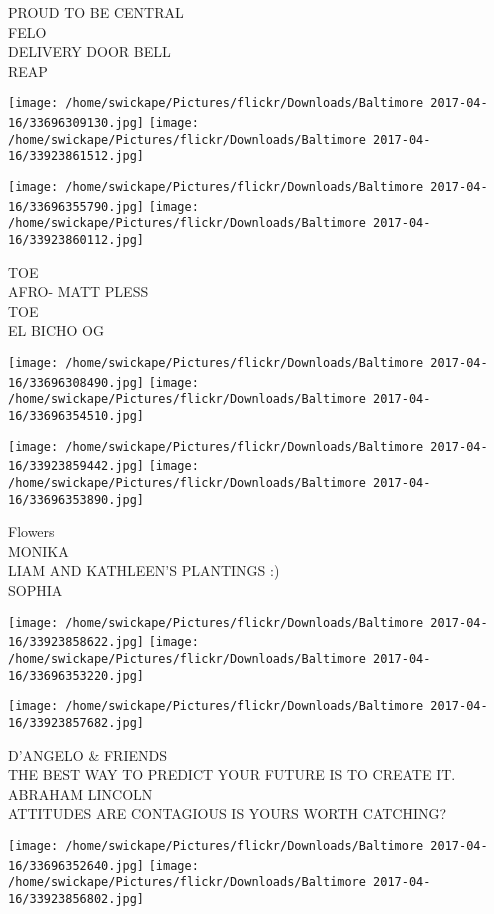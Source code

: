 \documentclass[10pt,letterpaper]{article}
\begin{document}
PROUD TO BE CENTRAL\\
FELO\\
DELIVERY DOOR BELL\\
REAP
\pagebreak

\texttt{[image: /home/swickape/Pictures/flickr/Downloads/Baltimore 2017-04-16/33696309130.jpg]}
\texttt{[image: /home/swickape/Pictures/flickr/Downloads/Baltimore 2017-04-16/33923861512.jpg]}

\texttt{[image: /home/swickape/Pictures/flickr/Downloads/Baltimore 2017-04-16/33696355790.jpg]}
\texttt{[image: /home/swickape/Pictures/flickr/Downloads/Baltimore 2017-04-16/33923860112.jpg]}

TOE\\
AFRO{-} MATT PLESS\\
TOE\\
EL BICHO OG
\pagebreak

\texttt{[image: /home/swickape/Pictures/flickr/Downloads/Baltimore 2017-04-16/33696308490.jpg]}
\texttt{[image: /home/swickape/Pictures/flickr/Downloads/Baltimore 2017-04-16/33696354510.jpg]}

\texttt{[image: /home/swickape/Pictures/flickr/Downloads/Baltimore 2017-04-16/33923859442.jpg]}
\texttt{[image: /home/swickape/Pictures/flickr/Downloads/Baltimore 2017-04-16/33696353890.jpg]}

Flowers\\
MONIKA\\
LIAM AND KATHLEEN'S PLANTINGS :)\\
SOPHIA
\pagebreak

\texttt{[image: /home/swickape/Pictures/flickr/Downloads/Baltimore 2017-04-16/33923858622.jpg]}
\texttt{[image: /home/swickape/Pictures/flickr/Downloads/Baltimore 2017-04-16/33696353220.jpg]}

\vspace{0.25in}
\texttt{[image: /home/swickape/Pictures/flickr/Downloads/Baltimore 2017-04-16/33923857682.jpg]}

D'ANGELO \& FRIENDS\\
THE BEST WAY TO PREDICT YOUR FUTURE IS TO CREATE IT. ABRAHAM LINCOLN\\
ATTITUDES ARE CONTAGIOUS IS YOURS WORTH CATCHING?
\pagebreak

\texttt{[image: /home/swickape/Pictures/flickr/Downloads/Baltimore 2017-04-16/33696352640.jpg]}
\texttt{[image: /home/swickape/Pictures/flickr/Downloads/Baltimore 2017-04-16/33923856802.jpg]}
\end{document}
